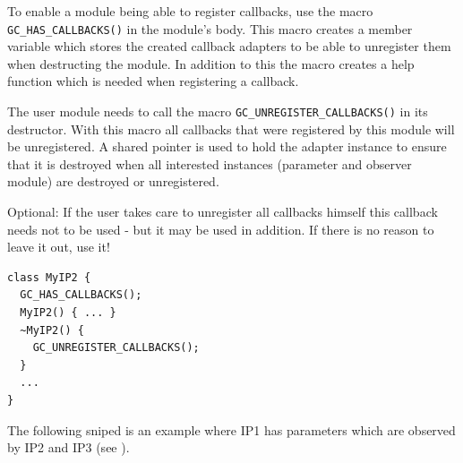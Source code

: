 To enable a module being able to register callbacks, use the macro \lstinline|GC_HAS_CALLBACKS()| in the module's body. This macro creates a member variable which stores the created callback adapters to be able to unregister them when destructing the module. In addition to this the macro creates a help function which is needed when registering a callback.

The user module needs to call the macro \lstinline|GC_UNREGISTER_CALLBACKS()| in its destructor.
With this macro all callbacks that were registered by this module will be unregistered. A shared pointer is used to hold the adapter instance to ensure that it is destroyed when all interested instances (parameter and observer module) are destroyed or unregistered.

Optional: If the user takes care to unregister all callbacks himself this callback needs not to be used - but it may be used in addition. If there is no reason to leave it out, use it!

\begin{lstlisting}
class MyIP2 {
  GC_HAS_CALLBACKS();
  MyIP2() { ... }
  ~MyIP2() {
    GC_UNREGISTER_CALLBACKS();
  }
  ...
}
\end{lstlisting}

The following sniped is an example where IP1 has parameters which are observed by IP2 and IP3 (see ).

